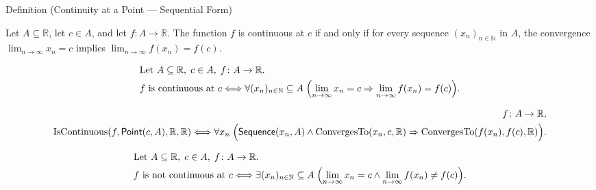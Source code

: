 \begin{definitionbox}{Definition (Continuity at a Point --- Sequential Form)}
\begin{definition}
\label{def:continuous-at-point-seq}
Let $A \subseteq \mathbb{R}$, let $c \in A$, and let $f \colon A \to \mathbb{R}$. The function $f$ is continuous at $c$ if and only if for every sequence $(x_n)_{n\in\mathbb{N}}$ in $A$, the convergence $\lim_{n\to\infty} x_n = c$ implies $\lim_{n\to\infty} f(x_n) = f(c)$.
\end{definition}
\end{definitionbox}

\begin{remark*}
\[
\begin{aligned}
&\text{Let } A \subseteq \mathbb{R},\; c \in A,\; f \colon A \to \mathbb{R}.\\
&f \text{ is continuous at } c \Longleftrightarrow
\forall (x_n)_{n\in\mathbb{N}} \subseteq A\;
\Bigl(\lim_{n\to\infty} x_n = c \Rightarrow \lim_{n\to\infty} f(x_n) = f(c)\Bigr).
\end{aligned}
\]
\end{remark*}

\begin{remark*}
\[
\begin{aligned}
  f\colon A\to\mathbb{R},\\
\operatorname{IsContinuous}(f,\mathsf{Point}(c,A),\mathbb R,\mathbb R)
\Longleftrightarrow
\forall x_n\;
\Bigl(\mathsf{Sequence}(x_n, A)
\land \operatorname{ConvergesTo}(x_n,c,\mathbb R)
\Rightarrow \operatorname{ConvergesTo}(f(x_n),f(c),\mathbb R)\Bigr).
\end{aligned}
\]
\end{remark*}

\begin{remark*}
\[
\begin{aligned}
&\text{Let } A \subseteq \mathbb{R},\; c \in A,\; f \colon A \to \mathbb{R}.\\
&f \text{ is not continuous at } c \Longleftrightarrow
\exists (x_n)_{n\in\mathbb{N}} \subseteq A\;
\Bigl(\lim_{n\to\infty} x_n = c \land \lim_{n\to\infty} f(x_n) \ne f(c)\Bigr).
\end{aligned}
\]
\end{remark*}

